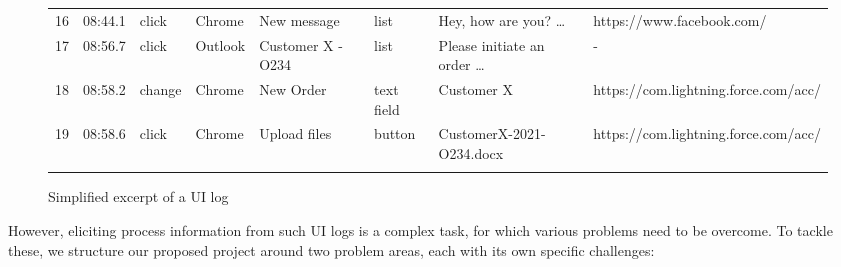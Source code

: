 \begin{figure}[h!]
\begin{adjustbox}{max width=\textwidth}
\begin{tabular}{llllllll}
16&08:44.1&click&Chrome&New message&list&Hey, how are you? …&https://www.facebook.com/\\\noalign{\smallskip}
17&08:56.7&click&Outlook&Customer X - O234&list&Please initiate an order …&-\\\noalign{\smallskip}
18&08:58.2&change&Chrome&New Order&text field&Customer X&https://com.lightning.force.com/acc/\\\noalign{\smallskip}
19&08:58.6&click&Chrome&Upload files&button&CustomerX-2021-O234.docx&https://com.lightning.force.com/acc/\\\noalign{\smallskip}
\hline\noalign{\smallskip}
\end{tabular}
\end{adjustbox}
\vspace{-1em}
\caption{Simplified excerpt of a UI log}
\label{fig:example}
\end{figure}

However, eliciting process information from such UI logs is a complex task, for which various problems need to be overcome. To tackle these, we structure our proposed project around two problem areas, each with its own specific challenges:

